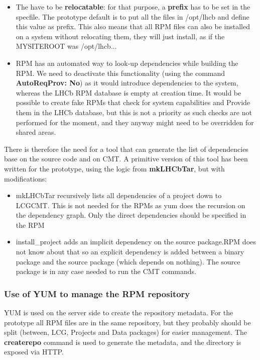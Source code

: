 \documentclass{lhcbnote}
\begin{document}
\begin{itemize}
\item The have to be \textbf{relocatable}: for that purpose, a \textbf{prefix} has to be set in the specfile. The prototype default is to put all the files in /opt/lhcb and define this value as prefix. This also means that all RPM files can also be installed on a system without relocating them, they will just install, as if the MYSITEROOT was /opt/lhcb...
\item RPM has an automated way to look-up dependencies while building the RPM. We need to deactivate this functionality (using the command \textbf{AutoReqProv: No}) as it would introduce dependencies to the system, whereas the LHCb RPM database is empty at creation time. It would be possible to create fake RPMs that check for system capabilities and Provide them in the LHCb database, but this is not a priority as such checks are not performed for the moment, and they anyway might need to be overridden for shared areas.
\end{itemize}

 There is therefore the need for a tool that can generate the list of dependencies base on the source code and on CMT. A primitive version of this tool has been written for the prototype, using the logic from \textbf{mkLHCbTar}, but with modifications:
\begin{itemize}
\item mkLHCbTar recursively lists all dependencies of a project down to LCGCMT. This is not needed for the RPMs as yum does the recursion on the dependency graph. Only the direct dependencies should be specified in the RPM
\item install\_project adds an implicit dependency on the source package.RPM does not know about that so an explicit dependency is added between a binary package and the source package (which depends on nothing). The source package is in any case needed to run the CMT commands.
\end{itemize}


\subsubsection{Use of YUM to manage the RPM repository}


YUM is used on the server side to create the repository metadata. For the prototype all RPM files are in the same repository, but they probably should be split (between, LCG, Projects and Data packages) for easier management. The \textbf{createrepo} command is used to generate the metadata, and the directory is exposed via HTTP.
\end{document}
